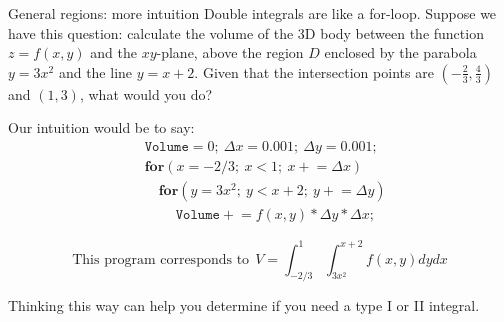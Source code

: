 \begin{frame}{General regions: more intuition}
    {\footnotesize Double integrals are like a for-loop. Suppose we have this question: calculate the volume of the 3D body between the function $z=f(x,y)$ and the $xy$-plane, above the region $D$ enclosed by the parabola $y=3x^2$ and the line $y=x+2$.  Given that the intersection points are $(-\frac{2}{3},\frac{4}{3})$ and $(1,3)$, what would you do?}

            \begin{minipage}{0.4\textwidth}
            \end{minipage}\pause
            \begin{minipage}{0.59\textwidth}
                Our intuition would be to say:
                \begin{align*}
                    &\texttt{Volume}=0;~\Delta x=0.001;~\Delta y=0.001;\\[-0.3mm]
                    &\textbf{for} (x=-2/3;~x<1;~x \mathrel{+}= \Delta x) \\[-0.7mm]
                    &\quad\textbf{for} (y=3x^2;~y<x+2;~y \mathrel{+}= \Delta y) \\[-0.2mm]
                    &\quad\quad~\texttt{Volume} \mathrel{+}= f(x,y)*\Delta y*\Delta x;
                \end{align*}
            \end{minipage}

            \pause\[\text{This program corresponds to}~~ V=\int_{-2/3}^{1}\int_{3x^2}^{x+2}f(x,y)dydx\]

            Thinking this way can help you determine if you need a type I or II integral.
\end{frame}


